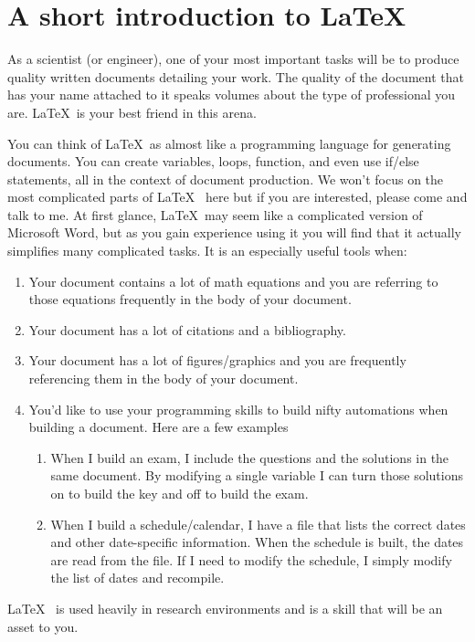\chapter{A short introduction to \LaTeX}
As a scientist (or engineer), one of your most important tasks will be
to produce quality written documents detailing your work.  The quality
of the document that has your name attached to it speaks volumes about
the type of professional you are.  \LaTeX ~is your best friend in this
arena.  

You can think of \LaTeX ~as almost like a programming language for
generating documents.  You can create variables, loops, function, and
even use if/else statements, all in the context of document
production.  We won't focus on the most complicated parts of \LaTeX~
here but if you are interested, please come and talk to me.  At first
glance, \LaTeX ~may seem like a complicated version of Microsoft Word, but as
you gain experience using it you will find that it actually simplifies
many complicated tasks.  It is an especially useful tools when:
\begin{enumerate}
\item Your document contains a lot of math equations and you are
  referring to those equations frequently in the body of your document.
\item Your document has a lot of citations and a bibliography.
\item Your document has a lot of figures/graphics and you are
  frequently referencing them in the body of your document.
\item You'd like to use your programming skills to build nifty
  automations when building a document.  Here are a few examples
\begin{enumerate}
\item When I build an exam, I include the questions and the solutions
  in the same document.  By modifying a single variable I can turn
  those solutions on to build the key and off to build the exam.
\item When I build a schedule/calendar, I have a file that lists the
  correct dates and other date-specific information.  When the
  schedule is built, the dates are read from the file.  If I need to
  modify the schedule, I simply modify the list of dates and
  recompile.
\end{enumerate}
\end{enumerate}
\LaTeX~ is used heavily in research environments and is a skill
that will be an asset to you.  

